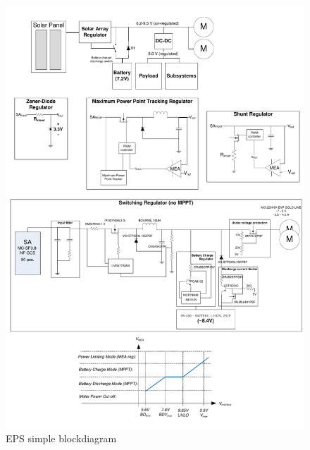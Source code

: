 \begin{figure}[H]
\centering
\includegraphics[width=\textwidth]{figures/fig_PDR_EPSdiagram}
\caption{\ac{EPS} simple blockdiagram}
\label{fig:EPS_diagram_simple}
\end{figure}
%
%
